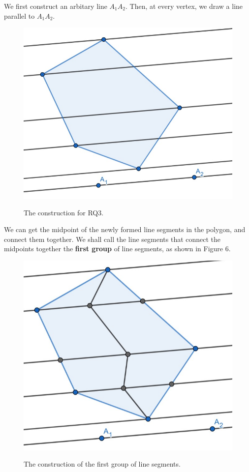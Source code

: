 \documentclass[12pt]{scrartcl}
\begin{document}
We first construct an arbitary line $A_{1}A_{2}$. Then, at every vertex, we draw a line parallel to $A_{1}A_{2}$.

\begin{figure}[htpb]
	\centering
	\includegraphics[scale=.75]{images/rq3_1_1.jpg}
	\label{fig:rq3_1_1_img}
	\caption{The construction for RQ3.}
\end{figure}

We can get the midpoint of the newly formed line segments in the polygon, and connect them together. We shall call the line segments that connect the midpoints together the \textbf{first group} of line segments, as shown in Figure 6.

\begin{figure}[htpb]
	\centering
	\includegraphics[scale=.75]{images/rq3_1_2.jpg}
	\label{fig:rq3_1_2_img}
	\caption{The construction of the first group of line segments.}
\end{figure}
\end{document}
